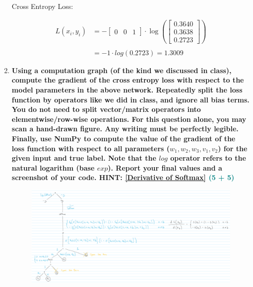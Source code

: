 \documentclass[a4paper]{article}
\begin{document}
\begin{sloppypar}
\begin{enumerate}[start=1,label=Q\arabic*,left=0pt]
    Cross Entropy Loss:

    \begin{align*}
        L(x_i, y_i) &= - \begin{bmatrix}0 & 0 & 1\end{bmatrix} \cdot \log\left(\begin{bmatrix}0.3640 \\ 0.3638 \\ 0.2723\end{bmatrix}\right) \\\\
        &= -1 \cdot log(0.2723) = 1.3009
    \end{align*}
    
    \item \textbf{Using a computation graph (of the kind we discussed in class), compute the gradient
    of the cross entropy loss with respect to the model parameters in the above network. Repeatedly split 
    the loss function by operators like we did in class, and ignore all bias terms.
    You do not need to split vector/matrix operators into elementwise/row-wise operations.
    For this question alone, you may scan a hand-drawn figure. Any writing must be perfectly
    legible. Finally, use NumPy to compute the value of the gradient of the loss function with
    respect to all parameters ($w_1, w_2, w_3, v_1, v_2$) for the given input and true label. Note that
    the $log$ operator refers to the natural logarithm (base $exp$). Report your final values and a
    screenshot of your code. HINT: \href{https://towardsdatascience.com/derivative-of-the-softmax-function-and-the-categorical-cross-entropy-loss-ffceefc081d1}{[Derivative of Softmax]} \hfill \textcolor{teal}{(5 + 5)}}
    
    \begin{figure}[H]
        \centering  
        \includegraphics[height=0.25\textheight]{Q3_tree.png}
        \label{fig:Q3_tree}
    \end{figure}


\end{enumerate}
\end{sloppypar}
\end{document}

